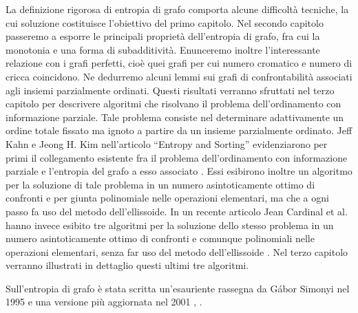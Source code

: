 La definizione rigorosa di entropia di grafo comporta alcune difficoltà tecniche, la cui soluzione costituisce l'obiettivo del primo capitolo. Nel secondo capitolo passeremo a esporre le principali proprietà dell'entropia di grafo, fra cui la monotonia e una forma di subadditività. Enunceremo inoltre l'interessante relazione con i grafi perfetti, cioè quei grafi per cui numero cromatico e numero di cricca coincidono. Ne dedurremo alcuni lemmi sui grafi di confrontabilità associati agli insiemi parzialmente ordinati. Questi risultati verranno sfruttati nel terzo capitolo per descrivere algoritmi che risolvano il problema dell'ordinamento con informazione parziale. Tale problema consiste nel determinare adattivamente un ordine totale fissato ma ignoto a partire da un insieme parzialmente ordinato. Jeff Kahn e Jeong H. Kim nell'articolo ``Entropy and Sorting'' evidenziarono per primi il collegamento esistente fra il problema dell'ordinamento con informazione parziale e l'entropia del grafo a esso associato \cite{Kahn1995}. Essi esibirono inoltre un algoritmo per la soluzione di tale problema in un numero asintoticamente ottimo di confronti e per giunta polinomiale nelle operazioni elementari, ma che a ogni passo fa uso del metodo dell'ellissoide. In un recente articolo Jean Cardinal et al. hanno invece esibito tre algoritmi per la soluzione dello stesso problema in un numero asintoticamente ottimo di confronti e comunque polinomiali nelle operazioni elementari, senza far uso del metodo dell'ellissoide \cite{Cardinal2010}. Nel terzo
capitolo verranno illustrati in dettaglio questi ultimi tre algoritmi.

Sull'entropia di grafo è stata scritta un'esauriente rassegna da G\'abor Simonyi nel 1995 e una versione più aggiornata nel 2001 \cite{Simonyi1995}, \cite{Simonyi2001}.
